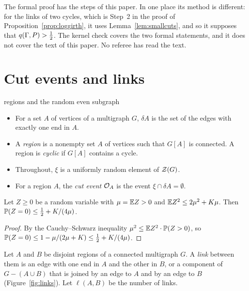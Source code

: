 \documentclass[11pt]{article}
\begin{document}
The formal proof has the steps of this paper. In one place its method is different: for the
links of two cycles, which is Step~2 in the proof of Proposition~\ref{prop:loggirth}, it uses
Lemma~\ref{lem:smallcuts}, and so it supposes that $q(\Gamma,P)>\tfrac12$. The kernel check covers
the two formal statements, and it does not cover the text of this paper. No referee has read
the text.

\section{Cut events and links}\label{sec:tools}

\begin{notation}{regions and the random even subgraph}
\begin{itemize}[leftmargin=1.2em]
\item For a set $A$ of vertices of a multigraph $G$, $\delta A$ is the set of the edges with
exactly one end in $A$.
\item A \emph{region} is a nonempty set $A$ of vertices such that $G[A]$ is connected. A region
is \emph{cyclic} if $G[A]$ contains a cycle.
\item Throughout, $\xi$ is a uniformly random element of $\mathcal{Z}(G)$.
\item For a region $A$, the \emph{cut event} $\mathcal{O}_A$ is the event $\xi\cap\delta A=\emptyset$.
\end{itemize}
\end{notation}

\begin{lemma}\label{lem:second}
Let $Z\ge0$ be a random variable with $\mu=\mathbb{E} Z>0$ and $\mathbb{E} Z^{2}\le2\mu^{2}+K\mu$. Then
$\mathbb{P}(Z=0)\le\tfrac12+K/(4\mu)$.
\end{lemma}

\begin{proof}
By the Cauchy--Schwarz inequality $\mu^{2}\le\mathbb{E} Z^{2}\cdot\mathbb{P}(Z>0)$, so
$\mathbb{P}(Z=0)\le1-\mu/(2\mu+K)\le\tfrac12+K/(4\mu)$.
\end{proof}

Let $A$ and $B$ be disjoint regions of a connected multigraph $G$. A \emph{link} between them is an
edge with one end in $A$ and the other in $B$, or a component of $G-(A\cup B)$ that is joined by an
edge to $A$ and by an edge to $B$ (Figure~\ref{fig:links}). Let $\ell(A,B)$ be the number of links.
\end{document}
